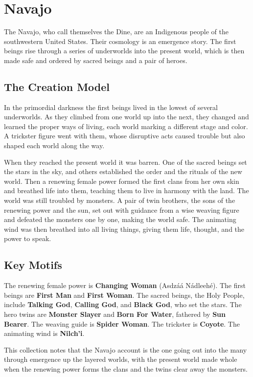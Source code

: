 \section{Navajo}

The Navajo, who call themselves the Dine, are an Indigenous people of the southwestern United States. Their cosmology is an emergence story. The first beings rise through a series of underworlds into the present world, which is then made safe and ordered by sacred beings and a pair of heroes.

\subsection{The Creation Model}

In the primordial darkness the first beings lived in the lowest of several underworlds. As they climbed from one world up into the next, they changed and learned the proper ways of living, each world marking a different stage and color. A trickster figure went with them, whose disruptive acts caused trouble but also shaped each world along the way.

When they reached the present world it was barren. One of the sacred beings set the stars in the sky, and others established the order and the rituals of the new world. Then a renewing female power formed the first clans from her own skin and breathed life into them, teaching them to live in harmony with the land. The world was still troubled by monsters. A pair of twin brothers, the sons of the renewing power and the sun, set out with guidance from a wise weaving figure and defeated the monsters one by one, making the world safe. The animating wind was then breathed into all living things, giving them life, thought, and the power to speak.

\subsection{Key Motifs}

The renewing female power is \textbf{Changing Woman} (Asdz\'a\'a N\'adleeh\'e). The first beings are \textbf{First Man} and \textbf{First Woman}. The sacred beings, the Holy People, include \textbf{Talking God}, \textbf{Calling God}, and \textbf{Black God}, who set the stars. The hero twins are \textbf{Monster Slayer} and \textbf{Born For Water}, fathered by \textbf{Sun Bearer}. The weaving guide is \textbf{Spider Woman}. The trickster is \textbf{Coyote}. The animating wind is \textbf{Nilch'i}.

This collection notes that the Navajo account is the one going out into the many through emergence up the layered worlds, with the present world made whole when the renewing power forms the clans and the twins clear away the monsters.
